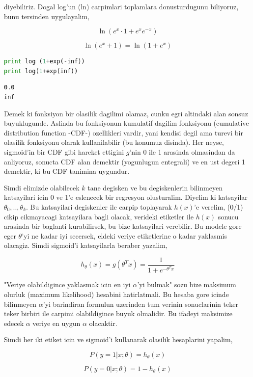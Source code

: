 \documentclass[12pt,fleqn]{article}\usepackage{../common}
\begin{document}
diyebiliriz. Dogal log'un (ln) carpimlari toplamlara donusturdugunu
biliyoruz, bunu tersinden uygulayalim,

$$ \ln (e^{x}\cdot 1 + e^{x}e^{-x})  $$

$$ \ln (e^{x} + 1)  = \ln (1 + e^{x} )  $$

\begin{lstlisting}[language=Python]
print log (1+exp(-inf))
print log(1+exp(inf))
\end{lstlisting}

\begin{verbatim}
0.0
inf
\end{verbatim}

Demek ki fonksiyon bir olasilik dagilimi olamaz, cunku egri altindaki
alan sonsuz buyuklugunde. Aslinda bu fonksiyonun kumulatif dagilim
fonksiyonu (cumulative distribution function -CDF-) ozellikleri
vardir, yani kendisi degil ama turevi bir olasilik fonksiyonu olarak
kullanilabilir (bu konumuz disinda).
Her neyse, sigmoid'in bir CDF gibi hareket ettigini $g$'nin 0 ile 1
arasinda olmasindan da anliyoruz, sonucta CDF alan demektir
(yogunlugun entegrali) ve en ust degeri 1 demektir, ki bu CDF tanimina
uygundur.

Simdi elimizde olabilecek $k$ tane degisken ve bu degiskenlerin
bilinmeyen katsayilari icin 0 ve 1'e eslenecek bir regresyon
olusturalim. Diyelim ki katsayilar $\theta_0,..,\theta_k$. Bu
katsayilari degiskenler ile carpip toplayarak $h(x)$'e verelim, (0/1)
cikip cikmayacagi katsayilara bagli olacak, verideki etiketler ile
$h(x)$ sonucu arasinda bir baglanti kurabilirsek, bu bize katsayilari
verebilir. Bu modele gore eger $\theta$'yi ne kadar iyi secersek,
eldeki veriye etiketlerine o kadar yaklasmis olacagiz. Simdi sigmoid'i
katsayilarla beraber yazalim,

$$ h_\theta(x) = g(\theta^T x) = \frac{1}{1+e^{-\theta^T x}} $$

"Veriye olabildigince yaklasmak icin en iyi $\alpha$'yi bulmak" sozu
bize maksimum olurluk (maximum likelihood) hesabini hatirlatmali. Bu
hesaba gore icinde bilinmeyen $\alpha$'yi barindiran formulun
uzerinden tum verinin sonuclarinin teker teker birbiri ile carpimi
olabildigince buyuk olmalidir. Bu ifadeyi maksimize edecek $\alpha$
veriye en uygun $\alpha$ olacaktir.

Simdi her iki etiket icin ve sigmoid'i kullanarak olasilik hesaplarini
yapalim,

$$ P(y=1 | x;\theta) = h_\theta(x) $$

$$ P(y=0 | x;\theta) = 1 - h_\theta(x) $$
\end{document}
